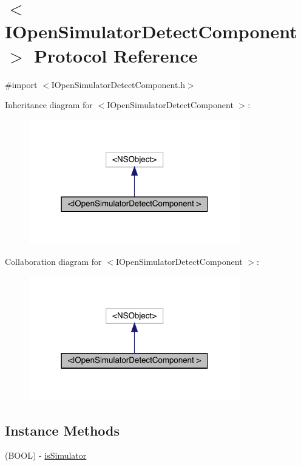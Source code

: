 \hypertarget{protocol_i_open_simulator_detect_component_01-p}{}\section{$<$I\+Open\+Simulator\+Detect\+Component $>$ Protocol Reference}
\label{protocol_i_open_simulator_detect_component_01-p}


{\ttfamily \#import $<$I\+Open\+Simulator\+Detect\+Component.\+h$>$}



Inheritance diagram for $<$I\+Open\+Simulator\+Detect\+Component $>$\+:\nopagebreak
\begin{figure}[H]
\begin{center}
\leavevmode
\includegraphics[width=261pt]{protocol_i_open_simulator_detect_component_01-p__inherit__graph}
\end{center}
\end{figure}


Collaboration diagram for $<$I\+Open\+Simulator\+Detect\+Component $>$\+:\nopagebreak
\begin{figure}[H]
\begin{center}
\leavevmode
\includegraphics[width=261pt]{protocol_i_open_simulator_detect_component_01-p__coll__graph}
\end{center}
\end{figure}
\subsection*{Instance Methods}
\begin{DoxyCompactItemize}
\item 
(B\+O\+OL) -\/ \mbox{\hyperlink{protocol_i_open_simulator_detect_component_01-p_aa65d30ce00d7936016fc06ec0f5dddd6}{is\+Simulator}}
\end{DoxyCompactItemize}


